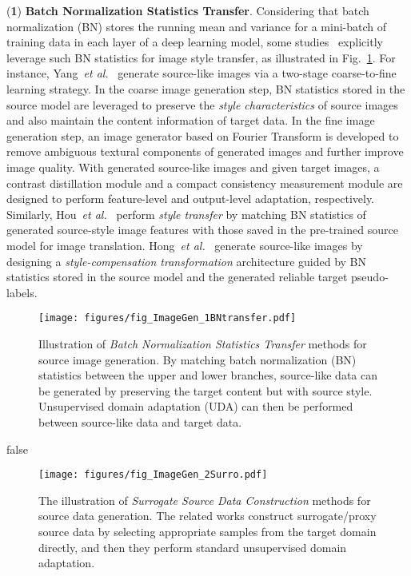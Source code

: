\documentclass[10pt,journal,compsoc]{IEEEtran}
\def\etal{{\em et al.}}
\begin{document}
(\textbf{1}) \textbf{Batch Normalization Statistics Transfer}. 
Considering that batch normalization (BN) stores the running mean and variance for a mini-batch of training data in each layer of a deep learning model, some studies~\cite{yang2022sourcefourier, hou2020source, hong2022source} explicitly leverage such BN statistics for image style transfer, as illustrated in Fig.~\ref{fig_ImageGen_1BNtransfer}.
For instance, Yang~\etal~\cite{yang2022sourcefourier} generate source-like images via a two-stage coarse-to-fine learning strategy. %
In the coarse image generation step, BN statistics stored in the source model are leveraged to preserve the \emph{style characteristics} of source images and also maintain the content information of target data.
In the fine image generation step, an image generator based on Fourier Transform is developed to remove ambiguous textural components of generated images and further improve image quality.
With generated source-like images and given target images, a contrast distillation module and a compact consistency measurement module are designed to perform feature-level and output-level adaptation, respectively.
Similarly, Hou~\etal~\cite{hou2020source} perform \emph{style transfer} by matching BN statistics of generated source-style image features with those saved in the pre-trained source model for image translation.
Hong~\etal~\cite{hong2022source} generate source-like images by designing a \emph{style-compensation transformation} architecture guided by BN statistics stored in the source model and the generated reliable target pseudo-labels.


\begin{figure}[!t]
\setlength{\abovecaptionskip}{0pt}
\setlength{\belowcaptionskip}{-2pt}
\setlength{\abovedisplayskip}{-2pt}
\setlength{\belowdisplayskip}{-2pt}
	\centering
	\texttt{[image: figures/fig\_ImageGen\_1BNtransfer.pdf]}
	\caption{
	Illustration of \emph{Batch Normalization Statistics Transfer} methods for source image generation. %
	By matching batch normalization (BN) statistics between the upper and lower branches, source-like data can be generated by preserving the target content but with source style. 
	Unsupervised domain adaptation (UDA) can then be performed between source-like data and target data.
	}
	\label{fig_ImageGen_1BNtransfer}
\end{figure}

\if false
\begin{figure}[!t]
\setlength{\abovecaptionskip}{0pt}
\setlength{\belowcaptionskip}{-2pt}
\setlength{\abovedisplayskip}{-2pt}
\setlength{\belowdisplayskip}{-2pt}
	\centering
	\texttt{[image: figures/fig\_ImageGen\_2Surro.pdf]}
	\caption{The illustration of \emph{Surrogate Source Data Construction} methods for source data generation.
	The related works construct surrogate/proxy source data by selecting appropriate samples from the target domain directly, and then they perform standard unsupervised domain adaptation.}
	\label{fig_ImageGen_2Surro}
\end{figure}
\fi
\end{document}
